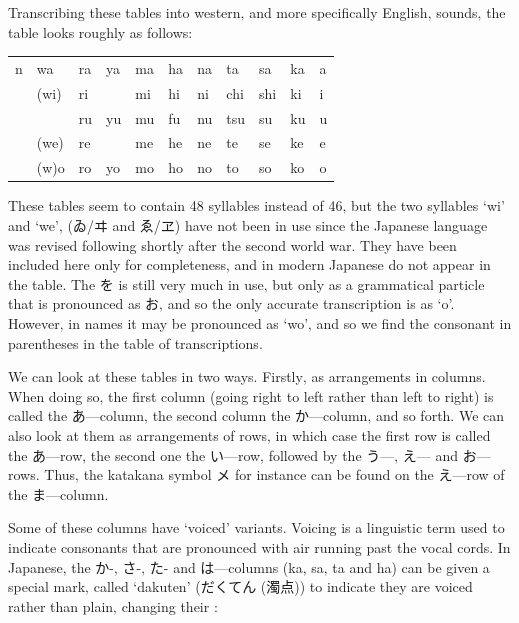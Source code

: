 \documentclass[11pt, b5paper, twoside, openright, onecolumn]{book}
\makeatletter
\newcommand*{\rubystack}[2]{{\relscale{0.5}%
  \begin{tabular}[b]{@{}c@{}}%
    {#1}\\%
   {\textscale{2}{#2}}%
  \end{tabular}}%
}
\DeclareRobustCommand*{\ruby}[2]{%
  \mbox{%
    \setlength{\parskip}{0ex}%
    \BeginAccSupp{method=pdfstringdef,ActualText={#1}}%
      \rubystack{\phantom{#2}}{#1}%
      \llap{%
        \rubystack{#2}{\phantom{#1}}%
      }%
    \EndAccSupp{}%
  }%
}
\renewcommand*{\ruby}[2]{#2 (#1)}%
\newenvironment{mytabular}[1]{\noindent\hspace{0.4in}
\begin{tabular}[h]{#1}}{\end{tabular}}
\makeatother
\begin{document}
Transcribing these tables into western‚ and more specifically English‚ sounds‚ the table looks roughly as follows:

\vspace{0.5cm}
\smaller
\begin{mytabular}{| l  l  l  l  l  l  l  l  l  l  l |}\hline 
\rule{0pt}{2.4ex}n & wa & ra & ya & ma & ha & na & ta & sa & ka & a\\ 
\rule{0pt}{2.4ex} & (wi) & ri &  & mi & hi & ni & chi & shi & ki & i\\ 
\rule{0pt}{2.4ex} &  & ru & yu & mu & fu & nu & tsu & su & ku & u\\ 
\rule{0pt}{2.4ex} & (we) & re &  & me & he & ne & te & se & ke & e\\ 
\rule{0pt}{2.4ex} & (w)o & ro & yo & mo & ho & no & to & so & ko & o\\ 
\hline 
\end{mytabular}
\larger
\vspace{0.5cm}


These tables seem to contain 48 syllables instead of 46‚ but the two syllables ‘wi’ and ‘we’‚ (ゐ/ヰ and ゑ/ヱ) have not been in use since the Japanese language was revised following shortly after the second world war. They have been included here only for completeness‚ and in modern Japanese do not appear in the  table. The を is still very much in use‚ but only as a grammatical particle that is pronounced as お‚ and so the only accurate transcription is as ‘o’. However‚ in names it may be pronounced as ‘wo’‚ and so we find the consonant in parentheses in the table of transcriptions.

We can look at these tables in two ways. Firstly‚ as arrangements in columns. When doing so‚ the first column (going right to left rather than left to right) is called the あ—column‚ the second column the か—column‚ and so forth. We can also look at them as arrangements of rows‚ in which case the first row is called the あ—row‚ the second one the い—row‚ followed by the う—‚ え— and お—rows. Thus‚ the katakana symbol メ for instance can be found on the え—row of the ま—column.

Some of these columns have ‘voiced’ variants. Voicing is a linguistic term used to indicate consonants that are pronounced with air running past the vocal cords. In Japanese‚ the か-‚ さ-‚ た- and は—columns (ka‚ sa‚ ta and ha) can be given a special  mark‚ called ‘dakuten’ (\ruby{濁点}{だくてん}) to indicate they are voiced rather than plain‚ changing their :
\end{document}

